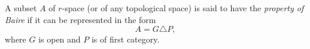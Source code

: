 A subset $A$ of $r$-space (or of any topological space) is said to have the \textit{property of Baire} if it can be represented in the form
$$A = G \triangle P,$$
where $G$ is open and $P$ is of first category.
